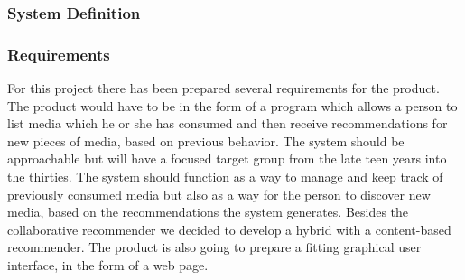 \subsubsection{System Definition}
\label{SysDefinition}

\subsubsection{Requirements}

For this project there has been prepared several requirements for the product. The product would have to be in the form of a program which allows a person to list media which he or she has consumed and then receive recommendations for new pieces of media, based on previous behavior. The system should be approachable but will have a focused target group from the late teen years into the thirties. The system should function as a way to manage and keep track of previously consumed media but also as a way for the person to discover new media, based on the recommendations the system generates. Besides the collaborative recommender we decided to develop a hybrid with a content-based recommender. The product is also going to prepare a fitting graphical user interface, in the form of a web page.


